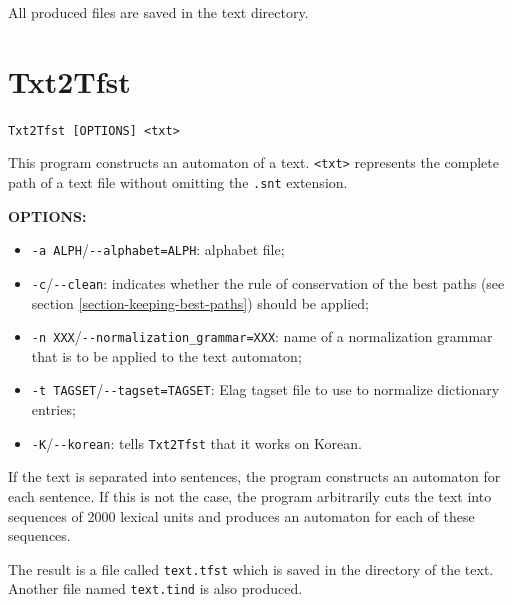 \bigskip
\noindent All produced files are saved in the text directory.








\section{Txt2Tfst} \verb+Txt2Tfst [OPTIONS] <txt>+

\bigskip
\noindent This program constructs an automaton of a text. \verb+<txt>+
represents the complete path of a text file without omitting the \verb+.snt+
extension.

\bigskip
\noindent \textbf{OPTIONS:}
\begin{itemize}
  \item \verb+-a ALPH+/\verb+--alphabet=ALPH+: alphabet file;
  
  \item \verb+-c+/\verb+--clean+: indicates whether the rule of conservation of 
  the best paths (see section \ref{section-keeping-best-paths}) 
  should be applied;
  
  \item \verb+-n XXX+/\verb+--normalization_grammar=XXX+: name of a normalization 
  grammar that is to be applied to the text automaton; 
  \item \verb+-t TAGSET+/\verb+--tagset=TAGSET+: Elag tagset file to use to
  normalize dictionary entries;
  \item \verb+-K+/\verb+--korean+: tells \verb+Txt2Tfst+ that it works on
  Korean.
\end{itemize}

\bigskip
\noindent If the text is separated into sentences, the program constructs an
automaton for each sentence. If this is not the case, the program arbitrarily
cuts the text into sequences of 2000 lexical units and produces an automaton for
each of these sequences.

\bigskip
\noindent The result is a file called \verb+text.tfst+ which is saved in the directory of
the text. Another file named \verb+text.tind+ is also produced.

